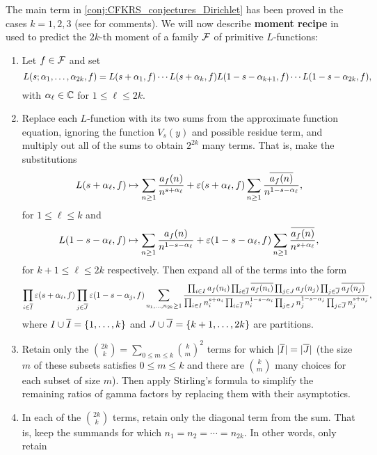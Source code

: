   The main term in \cref{conj:CFKRS_conjectures_Dirichlet} has been proved in the cases $k = 1,2,3$ (see \cite{conrey2005integral} for comments). We will now describe \textbf{moment recipe} in \cite{conrey2005integral} used to predict the $2k$-th moment of a family $\mathcal{F}$ of primitive $L$-functions:

  \begin{enumerate}[label*=(\roman*)]
    \item Let $f \in \mathcal{F}$ and set
    \[
      L(s;\alpha_{1},\ldots,\alpha_{2k},f) = L(s+\alpha_{1},f) \cdots L(s+\alpha_{k},f)L(1-s-\alpha_{k+1},f) \cdots L(1-s-\alpha_{2k},f),
    \]
    with $\alpha_{\ell} \in \mathbb{C}$ for $1 \le \ell \le 2k$.
    \item Replace each $L$-function with its two sums from the approximate function equation, ignoring the function $V_{s}(y)$ and possible residue term, and multiply out all of the sums to obtain $2^{2k}$ many terms. That is, make the substitutions
    \[
      L(s+\alpha_{\ell},f) \mapsto \sum_{n \ge 1}\frac{a_{f}(n)}{n^{s+\alpha_{\ell}}}+\varepsilon(s+\alpha_{\ell},f)\sum_{n \ge 1}\frac{\overline{a_{f}(n)}}{n^{1-s-\alpha_{\ell}}},
    \]
    for $1 \le \ell \le k$ and
    \[
      L(1-s-\alpha_{\ell},f) \mapsto \sum_{n \ge 1}\frac{a_{f}(n)}{n^{1-s-\alpha_{\ell}}}+\varepsilon(1-s-\alpha_{\ell},f)\sum_{n \ge 1}\frac{\overline{a_{f}(n)}}{n^{s+\alpha_{\ell}}},
    \]
    for $k+1 \le \ell \le 2k$ respectively. Then expand all of the terms into the form
    \[
      \prod_{i \in \overline{I}}\varepsilon(s+\alpha_{i},f)\prod_{j \in \overline{J}}\varepsilon(1-s-\alpha_{j},f)\sum_{n_{1},\ldots,n_{2k} \ge 1}\frac{\prod_{i \in I}a_{f}(n_{i})\prod_{i \in \overline{I}}\overline{a_{f}(n_{i})}\prod_{j \in J}a_{f}(n_{j})\prod_{j \in \overline{J}}\overline{a_{f}(n_{j})}}{\prod_{i \in I}n_{i}^{s+\alpha_{i}}\prod_{i \in \overline{I}}n_{i}^{1-s-\alpha_{i}}\prod_{j \in J}n_{j}^{1-s-\alpha_{j}}\prod_{j \in \overline{J}}n_{j}^{s+\alpha_{j}}},
    \]
    where $I \cup \overline{I} = \{1,\ldots,k\}$ and $J \cup \overline{J} = \{k+1,\ldots,2k\}$ are partitions.
    \item Retain only the $\binom{2k}{k} = \sum_{0 \le m \le k}\binom{k}{m}^{2}$ terms for which $|\overline{I}| = |\overline{J}|$ (the size $m$ of these subsets satisfies $0 \le m \le k$ and there are $\binom{k}{m}$ many choices for each subset of size $m$). Then apply Stirling's formula to simplify the remaining ratios of gamma factors by replacing them with their asymptotics.
    \item In each of the $\binom{2k}{k}$ terms, retain only the diagonal term from the sum. That is, keep the summands for which $n_{1} = n_{2} = \cdots = n_{2k}$. In other words, only retain

\end{enumerate}
